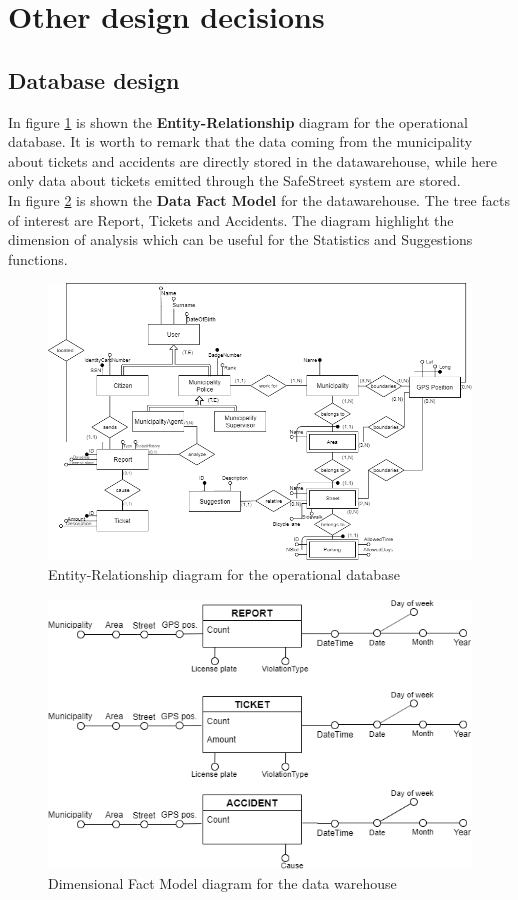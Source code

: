 \documentclass[a4paper]{report}
\begin{document}
\section{Other design decisions}
\subsection{Database design}
In figure \ref{fig:er} is shown the \textbf{Entity-Relationship} diagram for the operational database. It is worth to remark that the data coming from the municipality about tickets and accidents are directly stored in the datawarehouse, while here only data about tickets emitted through the SafeStreet system are stored.\\
In figure \ref{fig:dfm} is shown the \textbf{Data Fact Model} for the datawarehouse. The tree facts of interest are Report, Tickets and Accidents. The diagram highlight the dimension of analysis which can be useful for the Statistics and Suggestions functions.
\begin{figure}[htp]
\includegraphics[width=\textwidth]{ER}
\caption{Entity-Relationship diagram for the operational database}
\label{fig:er}
\end{figure}
\begin{figure}[htp]
\includegraphics[width=\textwidth]{DFM}
\caption{Dimensional Fact Model diagram for the data warehouse}
\label{fig:dfm}
\end{figure}
\end{document}
